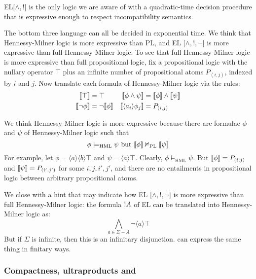 \NI EL[$\land, !$] is the only logic we are aware of with a
quadratic-time decision procedure that is expressive enough to respect
incompatibility semantics. 

The bottom three language can all be decided in exponential time.  We
think that Hennessy-Milner logic is more expressive than PL, and EL
[$\land, !, \neg$] is more expressive than full Hennessy-Milner logic.
To see that full Hennessy-Milner logic is more expressive than full
propositional logic, fix a propositional logic with the nullary
operator $\top$ plus an infinite number of propositional atoms
$P_{(i,j)}$, indexed by $i$ and $j$.  Now translate each formula of
Hennessy-Milner logic via the rules:
\begin{align*}
  \SEMB{\top}  & =  \top  &
  \SEMB{\phi \land \psi} & =  \SEMB{\phi} \land \SEMB{\psi}  \\
  \SEMB{\neg \phi} & =  \neg \SEMB{\phi}   &
  \SEMB{\langle a_i \rangle \phi_j} & =  P_{(i,j)} 
\end{align*}

\NI We think Hennessy-Milner logic is more expressive because there
are formulae $\phi$ and $\psi$ of Hennessy-Milner logic such that
\[
\phi \models_{\text{{HML}}} \psi \mbox{ but } \lbrack\!\lbrack \phi \rbrack\!\rbrack \nvDash_{\text{PL}} \lbrack\!\lbrack \psi \rbrack\!\rbrack
\]
For example, let $\phi = \langle a \rangle \langle b \rangle \top$ and
$\psi = \langle a \rangle \top$.  Clearly, $\phi \models_{\text{HML}}
\psi$. But $\lbrack\!\lbrack \phi \rbrack\!\rbrack = P_{(i,j)}$ and $\lbrack\!\lbrack \psi \rbrack\!\rbrack = P_{(i',j')}$
for some $i,j,i',j'$, and there are no entailments in propositional
logic between arbitrary propositional atoms.

We close with a hint that may indicate how EL [$\land, !, \neg$] is
more expressive than full Hennessy-Milner logic: the formula $!
A$ of EL can be translated into Hennessy-Milner logic as:
\[
\bigwedge_{a \in \Sigma - A} \neg \langle a \rangle \top
\]
But if $\Sigma$ is infinite, then this is an infinitary disjunction.
\Cathoristic{} can express the same thing in finitary ways.

\subsubsection{Compactness, ultraproducts and \cathoristic{}}

